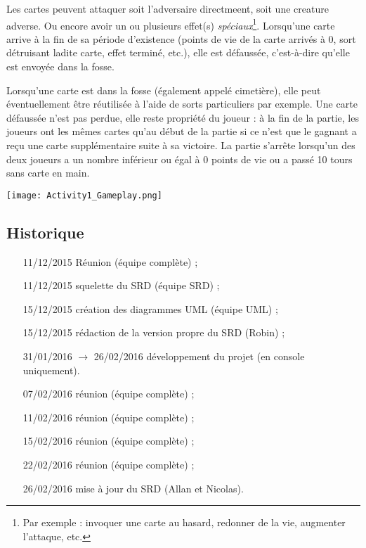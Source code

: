 \documentclass[12pt]{article}
\let\simplesubsection\subsection
\renewcommand{\subsection}{
	\needspace{0.5\pagetotal}
	\simplesubsection
}
\begin{document}
			Les cartes peuvent attaquer soit l'adversaire directmeent, soit une \gls{creature} adverse. Ou encore avoir un ou plusieurs effet(s) \textit{spéciaux}\footnote{Par exemple : \gls{invoquer} une carte au hasard, redonner de la vie, augmenter l'attaque, etc.}. 
			Lorsqu'une carte arrive à la fin de sa période d'existence (points de vie de la carte arrivés à 0, \gls{sort} détruisant ladite carte, effet terminé, etc.), elle est défaussée, c'est-à-dire qu'elle est envoyée dans la \gls{fosse}.
			
			Lorsqu'une carte est dans la \gls{fosse} (également appelé cimetière), elle peut éventuellement être réutilisée à l'aide de \glspl{sort} particuliers par exemple. Une carte défaussée n'est pas perdue, elle reste propriété du joueur : à la fin de la partie, les joueurs ont les mêmes cartes qu'au début de la partie si ce n'est que le gagnant a reçu une carte supplémentaire suite à sa victoire. La partie s'arrête lorsqu'un des deux joueurs a un nombre inférieur ou égal à 0 points de vie ou a passé 10 tours sans carte en main.

			\begin{center}\texttt{[image: Activity1\_Gameplay.png]}\end{center}

	\printnoidxglossary[title=Glossaire,style=listNoIndex] %

	\subsection{Historique}
		\begin{itemize}
			\item[11/12/2015] Réunion (équipe complète) ;
			\item[11/12/2015] squelette du SRD (équipe SRD) ;
			\item[15/12/2015] création des diagrammes UML (équipe UML) ;
			\item[15/12/2015] rédaction de la version propre du SRD (Robin) ;
			\item[31/01/2016 $\rightarrow$ 26/02/2016] développement du projet (en console uniquement).
			\item[07/02/2016] réunion (équipe complète) ;
			\item[11/02/2016] réunion (équipe complète) ;
			\item[15/02/2016] réunion (équipe complète) ;
			\item[22/02/2016] réunion (équipe complète) ;
			\item[26/02/2016] mise à jour du SRD (Allan et Nicolas).
		\end{itemize}
\end{document}
